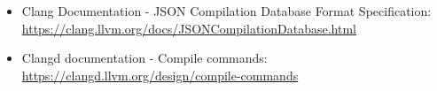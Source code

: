 
\begin{itemize}
\item
Clang Documentation - JSON Compilation Database Format Specification: \url{https://clang.llvm.org/docs/JSONCompilationDatabase.html}

\item
Clangd documentation - Compile commands: \url{https://clangd.llvm.org/design/compile-commands}
\end{itemize}